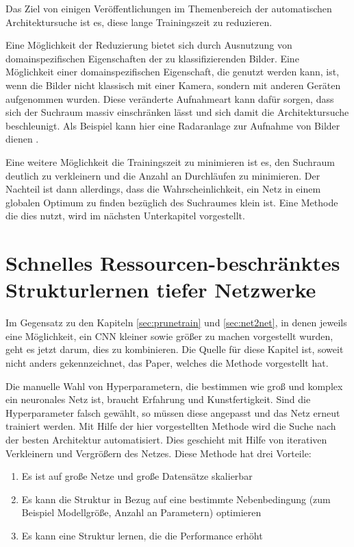 Das Ziel von einigen Veröffentlichungen im Themenbereich der automatischen Architektursuche ist es, diese lange Trainingszeit zu reduzieren.

Eine Möglichkeit der Reduzierung bietet sich durch Ausnutzung von domainspezifischen Eigenschaften der zu klassifizierenden Bilder. Eine Möglichkeit einer domainspezifischen Eigenschaft, die genutzt werden kann, ist, wenn die Bilder nicht klassisch mit einer Kamera, sondern mit anderen Geräten aufgenommen wurden. Diese veränderte Aufnahmeart kann dafür sorgen, dass sich der Suchraum massiv einschränken lässt und sich damit die Architektursuche beschleunigt.
Als Beispiel kann hier eine Radaranlage zur Aufnahme von Bilder dienen \cite{polsar}.


Eine weitere Möglichkeit die Trainingszeit zu minimieren ist es, den Suchraum deutlich zu verkleinern und die Anzahl an Durchläufen zu minimieren. Der Nachteil ist dann allerdings, dass die Wahrscheinlichkeit, ein Netz in einem globalen Optimum zu finden bezüglich des Suchraumes klein ist. Eine Methode die dies nutzt, wird im nächsten Unterkapitel vorgestellt.
\color{black}


\section{Schnelles Ressourcen-beschränktes Strukturlernen tiefer Netzwerke}\label{sec:morphnet}
Im Gegensatz zu den Kapiteln \ref{sec:prunetrain} und \ref{sec:net2net}, in denen jeweils eine Möglichkeit, ein CNN kleiner sowie größer zu machen vorgestellt wurden, geht es jetzt darum, dies zu kombinieren. Die Quelle für diese Kapitel ist, soweit nicht anders gekennzeichnet, das Paper, welches die Methode vorgestellt hat.

Die manuelle Wahl von Hyperparametern, die bestimmen wie groß und komplex ein neuronales Netz ist, 
braucht Erfahrung und Kunstfertigkeit. Sind die Hyperparameter falsch gewählt, so müssen diese angepasst und das Netz erneut trainiert werden. Mit Hilfe der hier vorgestellten Methode wird die Suche nach der besten Architektur automatisiert. Dies geschieht mit Hilfe von iterativen Verkleinern und Vergrößern des Netzes. Diese Methode hat drei Vorteile:
\begin{enumerate}
 \item Es ist auf große Netze und große Datensätze skalierbar
 \item Es kann die Struktur in Bezug auf eine bestimmte Nebenbedingung (zum Beispiel Modellgröße, Anzahl an Parametern) optimieren
 \item Es kann eine Struktur lernen, die die Performance erhöht
\end{enumerate}

